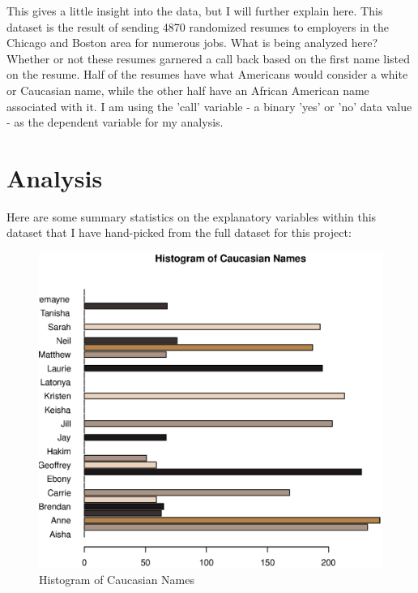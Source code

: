 \documentclass{paper}
\begin{document}
This gives a little insight into the data, but I will further explain here. This dataset is the result of sending 4870 randomized resumes to employers in the Chicago and Boston area for numerous jobs. What is being analyzed here? Whether or not these resumes garnered a call back based on the first name listed on the resume. Half of the resumes have what Americans would consider a white or Caucasian name, while the other half have an African American name associated with it. I am using the 'call' variable - a binary 'yes' or 'no' data value - as the dependent variable for my analysis.


\section{Analysis}


Here are some summary statistics on the explanatory variables within this dataset that I have hand-picked from the full dataset for this project:











\begin{figure}
\centering
\includegraphics[width=\textwidth]{../Figures/Histogram - Names, Caucasian.eps}
\caption{Histogram of Caucasian Names}
\label{fig:whitenames}
\end{figure}
\end{document}

